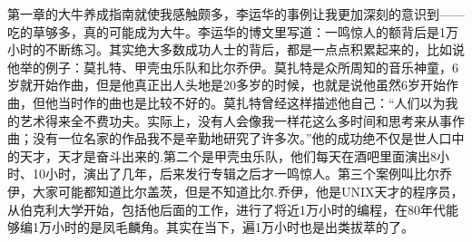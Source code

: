 \documentclass{article}
\begin{document}
%

第一章的大牛养成指南就使我感触颇多，李运华的事例让我更加深刻的意识到——吃的草够多，真的可能成为大牛。李运华的博文里写道：一鸣惊人的额背后是1万小时的不断练习。其实绝大多数成功人士的背后，都是一点点积累起来的，比如说他举的例子：莫扎特、甲壳虫乐队和比尔乔伊。莫扎特是众所周知的音乐神童，6岁就开始作曲，但是他真正出人头地是20多岁的时候，也就是说他虽然6岁开始作曲，但他当时作的曲也是比较不好的。莫扎特曾经这样描述他自己：“人们以为我的艺术得来全不费功夫。实际上，没有人会像我一样花这么多时间和思考来从事作曲；没有一位名家的作品我不是辛勤地研究了许多次。”他的成功绝不仅是世人口中的天才，天才是奋斗出来的.第二个是甲壳虫乐队，他们每天在酒吧里面演出8小时、10小时，演出了几年，后来发行专辑之后才一鸣惊人。第三个案例叫比尔乔伊，大家可能都知道比尔盖茨，但是不知道比尔.乔伊，他是UNIX天才的程序员，从伯克利大学开始，包括他后面的工作，进行了将近1万小时的编程，在80年代能够编1万小时的是凤毛麟角。其实在当下，遍1万小时也是出类拔萃的了。
\end{document}
